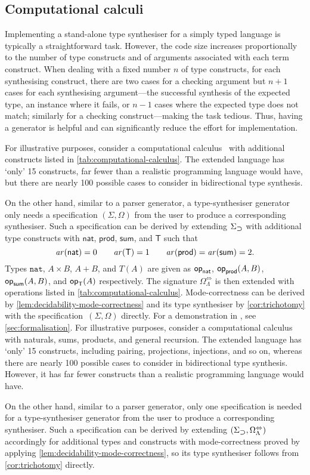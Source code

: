 \subsection{Computational calculi}\label{subsec:PCF}
Implementing a stand-alone type synthesiser for a simply typed language is typically a straightforward task.
However, the code size increases proportionally to the number of type constructs and of arguments associated with each term construct.
When dealing with a fixed number $n$ of type constructs, for each synthesising construct, there are two cases for a checking argument but $n + 1$ cases for each synthesising argument---the successful synthesis of the expected type, an instance where it fails, or $n-1$ cases where the expected type does not match; similarly for a checking construct---making the task tedious.
Thus, having a generator is helpful and can significantly reduce the effort for implementation.

\ifarxiv
For illustrative purposes, consider a computational calculus~\cite{Moggi1989} with additional constructs listed in \cref{tab:computational-calculus}.
The extended language has `only' 15 constructs, far fewer than a realistic programming language would have, but there are nearly 100 possible cases to consider in bidirectional type synthesis.

On the other hand, similar to a parser generator, a type-synthesiser generator only needs a specification $(\Sigma, \Omega)$ from the user to produce a corresponding synthesiser. 
Such a specification can be derived by extending $\Sigma_{\mathbin{\bm{\supset}}}$ with additional type constructs with $\mathsf{nat}$, $\mathsf{prod}$, $\mathsf{sum}$, and $\mathsf{T}$ such that
\[
  \mathit{ar}({\mathsf{nat}}) = 0\qquad
  \mathit{ar}({\mathsf{T}}) = 1\qquad
  \mathit{ar}({\mathsf{prod}}) = \mathit{ar}({\mathsf{sum}}) = 2.
\]
Types $\mathtt{nat}$, $A \times B$, $A + B$, and $T(A)$ are given as $\mathsf{op}_{\mathsf{nat}}$, $\mathsf{op}_{\mathsf{prod}}(A, B)$, $\mathsf{op}_{\mathsf{sum}}(A, B)$, and $\mathsf{op}_{\mathsf{T}}(A)$ respectively.
The signature $\Omega_{\Lambda}^{\Leftrightarrow}$ is then extended with operations listed in \cref{tab:computational-calculus}.
Mode-correctness can be derived by \cref{lem:decidability-mode-correctness} and its type synthesiser by \cref{cor:trichotomy} with the specification~$(\Sigma, \Omega)$ directly.
For a demonstration in \Agda, see \cref{sec:formalisation}.
\else
For illustrative purposes, consider a computational calculus~\cite{Moggi1989} with naturals, sums, products, and general recursion.
The extended language has `only' 15 constructs, including pairing, projections, injections, and so on, whereas there are nearly 100 possible cases to consider in bidirectional type synthesis.
However, it has far fewer constructs than a realistic programming language would have. 

On the other hand, similar to a parser generator, only one specification is needed for a type-synthesiser generator from the user to produce a corresponding synthesiser. 
Such a specification can be derived by extending $(\Sigma_{\mathbin{\bm{\supset}}}, \Omega_{\Lambda}^{\Leftrightarrow})$ accordingly for additional types and constructs with mode-correctness proved by applying \cref{lem:decidability-mode-correctness}, so its type synthesiser follows from \cref{cor:trichotomy} directly.
\fi
